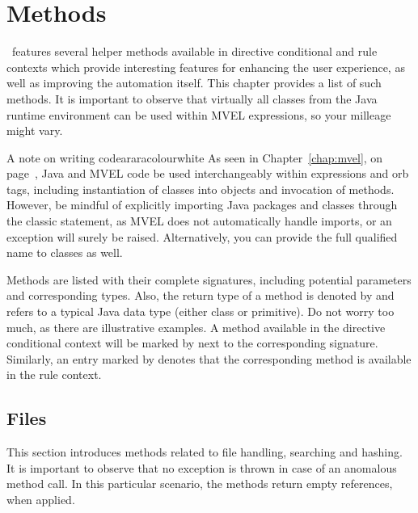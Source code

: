 \chapter{Methods}
\label{chap:methods}

\arara\ features several helper methods available in directive conditional and rule contexts which provide interesting features for enhancing the user experience, as well as improving the automation itself. This chapter provides a list of such methods. It is important to observe that virtually all classes from the Java runtime environment can be used within MVEL expressions, so your milleage might vary.

\begin{messagebox}{A note on writing code}{araracolour}{\icok}{white}
As seen in Chapter~\ref{chap:mvel}, on page~\pageref{chap:mvel}, Java and MVEL code be used interchangeably within expressions and orb tags, including instantiation of classes into objects and invocation of methods. However, be mindful of explicitly importing Java packages and classes through the classic  statement, as MVEL does not automatically handle imports, or an exception will surely be raised. Alternatively, you can provide the full qualified name to classes as well.
\end{messagebox}

Methods are listed with their complete signatures, including potential  parameters and corresponding types. Also, the return type of a method is denoted by  and refers to a typical Java data type (either class or primitive). Do not worry too much, as there are illustrative examples. A method available in the directive conditional context will be marked by  next to the corresponding signature. Similarly, an entry marked by  denotes that the corresponding method is available in the rule context.

\section{Files}
\label{sec:files}

This section introduces methods related to file handling, searching and hashing. It is important to observe that no exception is thrown in case of an anomalous method call. In this particular scenario, the methods return empty references, when applied.

